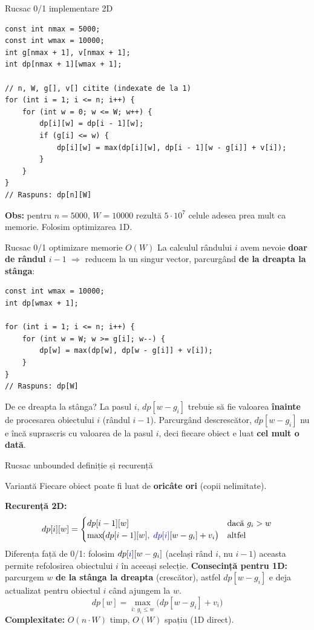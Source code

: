 \documentclass[10pt]{beamer}
\begin{document}
\begin{frame}[fragile]{Rucsac 0/1 \textemdash{} implementare 2D}
  \begin{lstlisting}
const int nmax = 5000;
const int wmax = 10000;
int g[nmax + 1], v[nmax + 1];
int dp[nmax + 1][wmax + 1];

// n, W, g[], v[] citite (indexate de la 1)
for (int i = 1; i <= n; i++) {
    for (int w = 0; w <= W; w++) {
        dp[i][w] = dp[i - 1][w];
        if (g[i] <= w) {
            dp[i][w] = max(dp[i][w], dp[i - 1][w - g[i]] + v[i]);
        }
    }
}
// Raspuns: dp[n][W]
  \end{lstlisting}
  \textbf{Obs:} pentru $n = 5000$, $W = 10000$ rezultă $5 \cdot 10^7$ celule \textemdash{}
  adesea prea mult ca memorie. Folosim optimizarea 1D.
\end{frame}

\begin{frame}[fragile]{Rucsac 0/1 \textemdash{} optimizare memorie $O(W)$}
  La calculul rândului $i$ avem nevoie \textbf{doar de rândul $i-1$}
  $\Rightarrow$ reducem la un singur vector, parcurgând \textbf{de la dreapta la stânga}:
  \begin{lstlisting}
const int wmax = 10000;
int dp[wmax + 1];

for (int i = 1; i <= n; i++) {
    for (int w = W; w >= g[i]; w--) {
        dp[w] = max(dp[w], dp[w - g[i]] + v[i]);
    }
}
// Raspuns: dp[W]
  \end{lstlisting}
  \begin{block}{De ce dreapta la stânga?}
    La pasul $i$, $dp[w - g_i]$ trebuie să fie valoarea \textbf{înainte} de procesarea
    obiectului $i$ (rândul $i-1$). Parcurgând descrescător, $dp[w - g_i]$ nu e încă
    suprascris cu valoarea de la pasul $i$, deci fiecare obiect e luat \textbf{cel mult o dată}.
  \end{block}
\end{frame}

\begin{frame}{Rucsac unbounded \textemdash{} definiție și recurență}
  \begin{block}{Variantă}
    Fiecare obiect poate fi luat de \textbf{oricâte ori} (copii nelimitate).
  \end{block}
  \smallskip
  \textbf{Recurență 2D:}
  \[
    dp[i][w] = \begin{cases}
      dp[i-1][w] & \text{dacă } g_i > w \\
      \max\!\bigl(dp[i-1][w],\; \textcolor{blue}{dp[i]}[w-g_i]+v_i\bigr) & \text{altfel}
    \end{cases}
  \]
  Diferența față de 0/1: folosim $dp[\textcolor{blue}{i}][w-g_i]$ (același rând $i$, nu $i-1$)
  \textemdash{} aceasta permite refolosirea obiectului $i$ în aceeași selecție.
  \smallskip
  \textbf{Consecință pentru 1D:} parcurgem $w$ \textbf{de la stânga la dreapta} (crescător),
  astfel $dp[w - g_i]$ e deja actualizat pentru obiectul $i$ când ajungem la $w$.
  \[
    dp[w] = \max_{i:\,g_i \le w}\bigl(dp[w - g_i] + v_i\bigr)
  \]
  \textbf{Complexitate:} $O(n \cdot W)$ timp, $O(W)$ spațiu (1D direct).
\end{frame}
\end{document}
